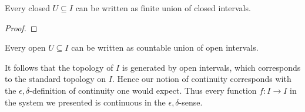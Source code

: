 \begin{lemma}
  Every closed $U\subseteq I$ can be written as finite union of closed intervals.
\end{lemma}
\begin{proof}

\end{proof}


\begin{corollary}
  Every open $U\subseteq I$ can be written as countable union of open intervals.
\end{corollary} 

\begin{remark}
  It follows that the topology of $I$ is generated by open intervals, 
  which corresponds to the standard topology on $I$. 
  Hence our notion of continuity corresponds with the $\epsilon,\delta$-definition of continuity one would expect. 
  Thus every function $f:I\to I$ in the system we presented is continuous in the $\epsilon,\delta$-sense. 
\end{remark}
